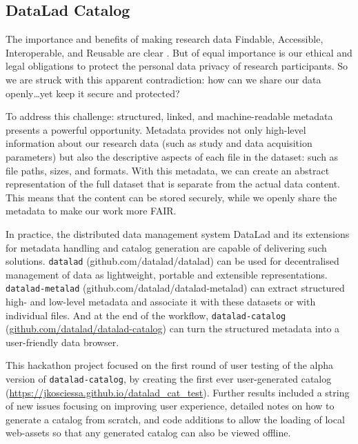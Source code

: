 \documentclass[../main.tex]{subfiles}
\begin{document}
\subsection{DataLad Catalog}


The importance and benefits of making research data Findable, Accessible, Interoperable, and Reusable are clear \parencite{Wilkinson2016}. But of equal importance is our ethical and legal obligations to protect the personal data privacy of research participants. So we are struck with this apparent contradiction: how can we share our data openly…yet keep it secure and protected?

To address this challenge: structured, linked, and machine-readable metadata presents a powerful opportunity. Metadata provides not only high-level information about our research data (such as study and data acquisition parameters) but also the descriptive aspects of each file in the dataset: such as file paths, sizes, and formats. With this metadata, we can create an abstract representation of the full dataset that is separate from the actual data content. This means that the content can be stored securely, while we openly share the metadata to make our work more FAIR.

In practice, the distributed data management system DataLad \parencite{Halchenko2021} and its extensions for metadata handling and catalog generation are capable of delivering such solutions. \texttt{datalad} (github.com/datalad/datalad) can be used for decentralised management of data as lightweight, portable and extensible representations. \texttt{datalad-metalad} (github.com/datalad/datalad-metalad) can extract structured high- and low-level metadata and associate it with these datasets or with individual files. And at the end of the workflow, \texttt{datalad-catalog} (\url{github.com/datalad/datalad-catalog}) can turn the structured metadata into a user-friendly data browser.

This hackathon project focused on the first round of user testing of the alpha version of \texttt{datalad-catalog}, by creating the first ever user-generated catalog (\url{https://jkosciessa.github.io/datalad_cat_test}). Further results included a string of new issues focusing on improving user experience, detailed notes on how to generate a catalog from scratch, and code additions to allow the loading of local web-assets so that any generated catalog can also be viewed offline.
\end{document}
